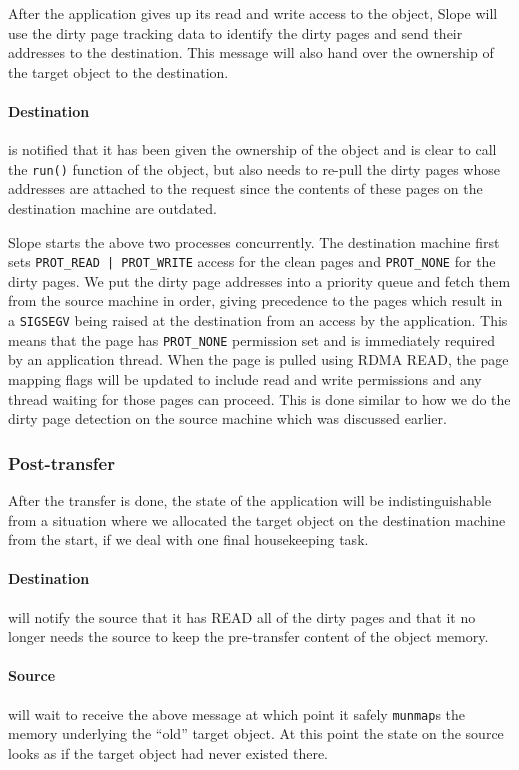 After the application gives up its read and write access to the object,
Slope will use the dirty
page tracking data to identify the dirty pages and send their addresses
to the destination. This message will also hand over the ownership
of the target object to the destination.

\paragraph{Destination} is notified that it has been given the ownership of
the object and is clear to call the \texttt{run()} function of the object,
but also needs to re-pull the dirty pages whose addresses are attached to the
request since the contents of these pages on the destination machine are
outdated.

Slope starts the above two processes concurrently. The destination machine
first sets
\texttt{PROT\_READ | PROT\_WRITE} access for the clean pages and
\texttt{PROT\_NONE} for the dirty pages. We put the dirty page addresses into 
a priority queue and fetch them from the source machine in order, giving
precedence to the pages which result in a
\texttt{SIGSEGV} being raised at the destination from an access by the
application. This means that the page has \texttt{PROT\_NONE} permission set and
is immediately required by an application thread. When the page is pulled using
RDMA READ, the page mapping flags will be updated to include read and write
permissions and any thread waiting for those pages can proceed. This is done
similar to how we do the dirty page detection on the source machine which was
discussed earlier.

\subsubsection{Post-transfer}
After the transfer is done, the state of the application will be
indistinguishable from a situation where we allocated the target object on
the destination machine from the start, if we deal with one final housekeeping
task.

\paragraph{Destination} will notify the source that it has READ all of the
dirty pages and that it no longer needs the source to keep the
pre-transfer content of the object memory.

\paragraph{Source} will wait to receive the above message at which point it
safely \texttt{munmap}s the memory underlying the ``old'' target object. At
this point the state on the source looks as if the target object had never existed
there.

